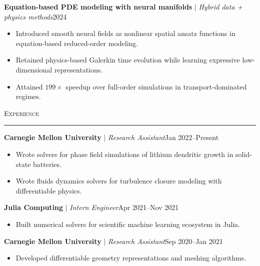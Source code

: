 \documentclass[10pt]{article}
\newcommand{\cvsection}[1]{%
  \vspace{0.25em}%
  {\Large\textsc{#1}}\\[-0.90em]
  \rule{\linewidth}{0.4pt}
  \vspace{-0.10em}
}
\newcommand{\cvrole}[3]{\textbf{#1} $|$ \textit{#2}\hfill #3}
\begin{document}
\cvrole{Equation-based PDE modeling with neural manifolds}{Hybrid data + physics methods}{2024}
\begin{itemize}[leftmargin=1.45em,labelindent=0.45em]
  \item Introduced smooth neural fields as nonlinear spatial ansatz functions in equation-based reduced-order modeling.
  \item Retained physics-based Galerkin time evolution while learning expressive low-dimensional representations.
  \item Attained $199\times$ speedup over full-order simulations in transport-dominated regimes.
\end{itemize}

\cvsection{Experience}
%
\cvrole{Carnegie Mellon University}{Research Assistant}{Jan 2022--Present}
\begin{itemize}[leftmargin=1.45em,labelindent=0.45em]
  \item Wrote solvers for phase field simulations of lithium dendritic growth in solid-state batteries.
  \item Wrote fluids dynamics solvers for turbulence closure modeling with differentiable physics.
\end{itemize}
%
\cvrole{Julia Computing}{Intern Engineer}{Apr 2021--Nov 2021}
\begin{itemize}[leftmargin=1.45em,labelindent=0.45em]
  \item Built numerical solvers for scientific machine learning ecosystem in Julia.
\end{itemize}

\cvrole{Carnegie Mellon University}{Research Assistant}{Sep 2020--Jan 2021}
\begin{itemize}[leftmargin=1.45em,labelindent=0.45em]
  \item Developed differentiable geometry representations and meshing algorithms.
\end{itemize}
\end{document}
